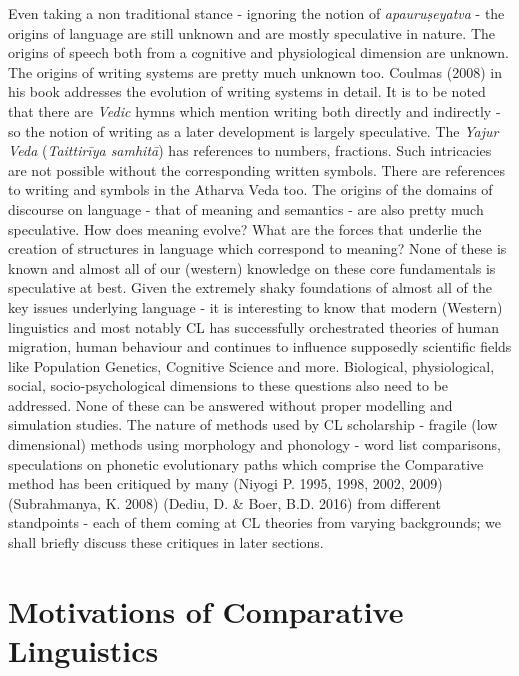 Even taking a non traditional stance - ignoring the notion of \textit{apauruṣeyatva} - the origins of language are still unknown and are mostly speculative in nature. The origins of speech both from a cognitive and physiological dimension are unknown. The origins of writing systems are pretty much unknown too. Coulmas (2008) in his book addresses the evolution of writing systems in detail. It is to be noted that there are \textit{Vedic} hymns which mention writing both directly and indirectly - so the notion of writing as a later development is largely speculative. The \textit{Yajur Veda} (\textit{Taittirīya samhitā}) has references to numbers, fractions. Such intricacies are not possible without the corresponding written symbols. There are references to writing and symbols in the Atharva Veda too. The origins of the domains of discourse on language - that of meaning and semantics - are also pretty much speculative. How does meaning evolve? What are the forces that underlie the creation of structures in language which correspond to meaning? None of these is known and almost all of our (western) knowledge on these core fundamentals is speculative at best. Given the extremely shaky foundations of almost all of the key issues underlying language - it is interesting to know that modern (Western) linguistics and most notably CL has successfully orchestrated theories of human migration, human behaviour and continues to influence supposedly scientific fields like Population Genetics, Cognitive Science and more. Biological, physiological, social, socio-psychological dimensions to these questions also need to be addressed. None of these can be answered without proper modelling and simulation studies. The nature of methods used by CL scholarship - fragile (low dimensional) methods using morphology and phonology - word list comparisons, speculations on phonetic evolutionary paths which comprise the Comparative method has been critiqued by many (Niyogi P. 1995, 1998, 2002, 2009) (Subrahmanya, K. 2008) (Dediu, D. \& Boer, B.D. 2016) from different standpoints - each of them coming at CL theories from varying backgrounds; we shall briefly discuss these critiques in later sections.


\section*{Motivations of Comparative Linguistics}

